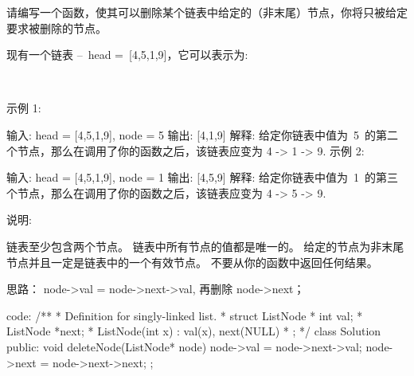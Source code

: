 请编写一个函数，使其可以删除某个链表中给定的（非末尾）节点，你将只被给定要求被删除的节点。

现有一个链表 -- head = [4,5,1,9]，它可以表示为:



 

示例 1:

输入: head = [4,5,1,9], node = 5
输出: [4,1,9]
解释: 给定你链表中值为 5 的第二个节点，那么在调用了你的函数之后，该链表应变为 4 -> 1 -> 9.
示例 2:

输入: head = [4,5,1,9], node = 1
输出: [4,5,9]
解释: 给定你链表中值为 1 的第三个节点，那么在调用了你的函数之后，该链表应变为 4 -> 5 -> 9.
 

说明:

链表至少包含两个节点。
链表中所有节点的值都是唯一的。
给定的节点为非末尾节点并且一定是链表中的一个有效节点。
不要从你的函数中返回任何结果。





















思路：
node->val = node->next->val, 再删除 node->next；























code:
/**
 * Definition for singly-linked list.
 * struct ListNode {
 *     int val;
 *     ListNode *next;
 *     ListNode(int x) : val(x), next(NULL) {}
 * };
 */
class Solution {
public:
    void deleteNode(ListNode* node) {
        node->val = node->next->val;
        node->next = node->next->next;
    }
};